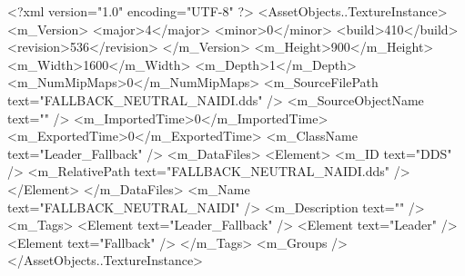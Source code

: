 <?xml version="1.0" encoding="UTF-8" ?>
<AssetObjects..TextureInstance>
	<m_Version>
		<major>4</major>
		<minor>0</minor>
		<build>410</build>
		<revision>536</revision>
	</m_Version>
	<m_Height>900</m_Height>
	<m_Width>1600</m_Width>
	<m_Depth>1</m_Depth>
	<m_NumMipMaps>0</m_NumMipMaps>
	<m_SourceFilePath text="FALLBACK_NEUTRAL_NAIDI.dds" />
	<m_SourceObjectName text="" />
	<m_ImportedTime>0</m_ImportedTime>
	<m_ExportedTime>0</m_ExportedTime>
	<m_ClassName text="Leader_Fallback" />
	<m_DataFiles>
		<Element>
			<m_ID text="DDS" />
			<m_RelativePath text="FALLBACK_NEUTRAL_NAIDI.dds" />
		</Element>
	</m_DataFiles>
	<m_Name text="FALLBACK_NEUTRAL_NAIDI" />
	<m_Description text="" />
	<m_Tags>
		<Element text="Leader_Fallback" />
		<Element text="Leader" />
		<Element text="Fallback" />
	</m_Tags>
	<m_Groups />
</AssetObjects..TextureInstance>
